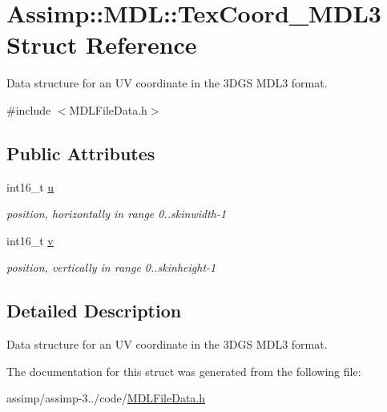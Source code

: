 \hypertarget{struct_assimp_1_1_m_d_l_1_1_tex_coord___m_d_l3}{\section{Assimp\+:\+:M\+D\+L\+:\+:Tex\+Coord\+\_\+\+M\+D\+L3 Struct Reference}
\label{struct_assimp_1_1_m_d_l_1_1_tex_coord___m_d_l3}
}


Data structure for an U\+V coordinate in the 3\+D\+G\+S M\+D\+L3 format.  




{\ttfamily \#include $<$M\+D\+L\+File\+Data.\+h$>$}

\subsection*{Public Attributes}
\begin{DoxyCompactItemize}
\item 
\hypertarget{struct_assimp_1_1_m_d_l_1_1_tex_coord___m_d_l3_a9b4232954c63ce8d501e1c7066da10b0}{int16\+\_\+t \hyperlink{struct_assimp_1_1_m_d_l_1_1_tex_coord___m_d_l3_a9b4232954c63ce8d501e1c7066da10b0}{u}}\label{struct_assimp_1_1_m_d_l_1_1_tex_coord___m_d_l3_a9b4232954c63ce8d501e1c7066da10b0}

\begin{DoxyCompactList}\small\item\em position, horizontally in range 0..skinwidth-\/1 \end{DoxyCompactList}\item 
\hypertarget{struct_assimp_1_1_m_d_l_1_1_tex_coord___m_d_l3_a58dc5e36fc503c7464f33f610cd75e87}{int16\+\_\+t \hyperlink{struct_assimp_1_1_m_d_l_1_1_tex_coord___m_d_l3_a58dc5e36fc503c7464f33f610cd75e87}{v}}\label{struct_assimp_1_1_m_d_l_1_1_tex_coord___m_d_l3_a58dc5e36fc503c7464f33f610cd75e87}

\begin{DoxyCompactList}\small\item\em position, vertically in range 0..skinheight-\/1 \end{DoxyCompactList}\end{DoxyCompactItemize}


\subsection{Detailed Description}
Data structure for an U\+V coordinate in the 3\+D\+G\+S M\+D\+L3 format. 

The documentation for this struct was generated from the following file\+:\begin{DoxyCompactItemize}
\item 
assimp/assimp-\/3../code/\hyperlink{_m_d_l_file_data_8h}{M\+D\+L\+File\+Data.\+h}\end{DoxyCompactItemize}
